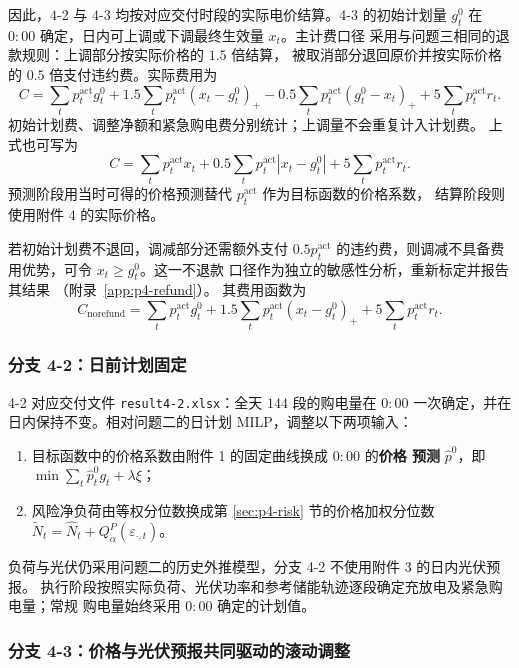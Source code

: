 因此，$4$-2 与 $4$-3 均按对应交付时段的实际电价结算。4-3 的初始计划量
$g_t^0$ 在 $0{:}00$ 确定，日内可上调或下调最终生效量 $x_t$。主计费口径
采用与问题三相同的退款规则：上调部分按实际价格的 $1.5$ 倍结算，
被取消部分退回原价并按实际价格的 $0.5$ 倍支付违约费。实际费用为
$$
C=\sum_t p_t^{\mathrm{act}}g_t^0
+1.5\sum_t p_t^{\mathrm{act}}(x_t-g_t^0)_+
-0.5\sum_t p_t^{\mathrm{act}}(g_t^0-x_t)_+
+5\sum_t p_t^{\mathrm{act}}r_t .
$$
初始计划费、调整净额和紧急购电费分别统计；上调量不会重复计入计划费。
上式也可写为
$$
C=\sum_t p_t^{\mathrm{act}}x_t+
0.5\sum_t p_t^{\mathrm{act}}|x_t-g_t^0|+
5\sum_t p_t^{\mathrm{act}}r_t .
$$
预测阶段用当时可得的价格预测替代 $p_t^{\mathrm{act}}$ 作为目标函数的价格系数，
结算阶段则使用附件 4 的实际价格。

若初始计划费不退回，调减部分还需额外支付 $0.5p_t^{\mathrm{act}}$
的违约费，则调减不具备费用优势，可令 $x_t\ge g_t^0$。这一不退款
口径作为独立的敏感性分析，重新标定并报告其结果
（附录~\ref{app:p4-refund}）。
其费用函数为
$$
C_{\mathrm{norefund}}=\sum_t p_t^{\mathrm{act}}g_t^0
+1.5\sum_t p_t^{\mathrm{act}}(x_t-g_t^0)_+
+5\sum_t p_t^{\mathrm{act}}r_t .
$$

\subsubsection{分支 4-2：日前计划固定}

4-2 对应交付文件 \texttt{result4-2.xlsx}：全天 $144$ 段的购电量在 $0{:}00$
一次确定，并在日内保持不变。相对问题二的日计划 MILP，调整以下两项输入：

\begin{enumerate}
  \item 目标函数中的价格系数由附件 1 的固定曲线换成 $0{:}00$ 的\textbf{价格
        预测} $\widehat p^{0}$，即 $\min\sum_t\widehat p^{0}_t g_t+\lambda\xi$；
  \item 风险净负荷由等权分位数换成第 \ref{sec:p4-risk} 节的价格加权分位数
        $\widetilde N_t=\widehat N_t+Q^{P}_{\alpha}(\varepsilon_{\cdot,t})$。
\end{enumerate}

负荷与光伏仍采用问题二的历史外推模型，分支 4-2 不使用附件 3 的日内光伏预报。
执行阶段按照实际负荷、光伏功率和参考储能轨迹逐段确定充放电及紧急购电量；常规
购电量始终采用 $0{:}00$ 确定的计划值。

\subsubsection{分支 4-3：价格与光伏预报共同驱动的滚动调整}

